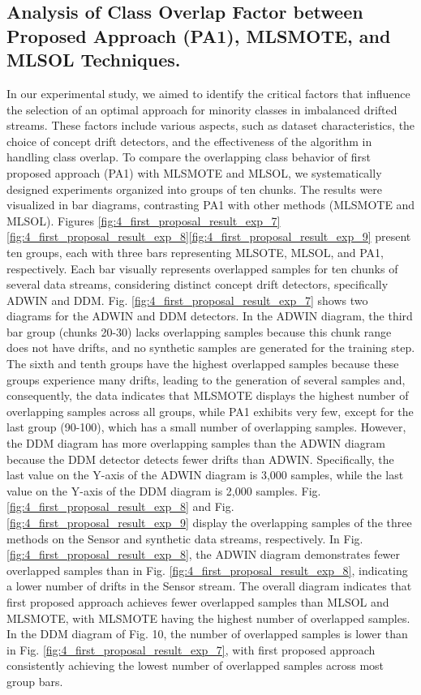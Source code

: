 \subsection{Analysis of Class Overlap Factor between Proposed Approach (PA1), MLSMOTE, and MLSOL Techniques.}
In our experimental study, we aimed to identify the critical factors that influence the selection of an optimal approach for minority classes in imbalanced drifted streams. These factors include various aspects, such as dataset characteristics, the choice of concept drift detectors, and the effectiveness of the algorithm in handling class overlap. To compare the overlapping class behavior of first proposed approach (PA1) with MLSMOTE and MLSOL, we systematically designed experiments organized into groups of ten chunks. The results were visualized in bar diagrams, contrasting PA1 with other methods (MLSMOTE and MLSOL). Figures \ref{fig:4_first_proposal_result_exp_7}\ref{fig:4_first_proposal_result_exp_8}\ref{fig:4_first_proposal_result_exp_9} present ten groups, each with three bars representing MLSOTE, MLSOL, and PA1, respectively. Each bar visually represents overlapped samples for ten chunks of several data streams, considering distinct concept drift detectors, specifically ADWIN and DDM.
Fig. \ref{fig:4_first_proposal_result_exp_7} shows two diagrams for the ADWIN and DDM detectors. In the ADWIN diagram, the third bar group (chunks 20-30) lacks overlapping samples because this chunk range does not have drifts, and no synthetic samples are generated for the training step. The sixth and tenth groups have the highest overlapped samples because these groups experience many drifts, leading to the generation of several samples and, consequently, the data indicates that MLSMOTE displays the highest number of overlapping samples across all groups, while PA1 exhibits very few, except for the last group (90-100), which has a small number of overlapping samples. However, the DDM diagram has more overlapping samples than the ADWIN diagram because the DDM detector detects fewer drifts than ADWIN. Specifically, the last value on the Y-axis of the ADWIN diagram is 3,000 samples, while the last value on the Y-axis of the DDM diagram is 2,000 samples. Fig. \ref{fig:4_first_proposal_result_exp_8} and Fig. \ref{fig:4_first_proposal_result_exp_9} display the overlapping samples of the three methods on the Sensor and synthetic data streams, respectively. In Fig. \ref{fig:4_first_proposal_result_exp_8}, the ADWIN diagram demonstrates fewer overlapped samples than in Fig. \ref{fig:4_first_proposal_result_exp_8}, indicating a lower number of drifts in the Sensor stream. The overall diagram indicates that first proposed approach achieves fewer overlapped samples than MLSOL and MLSMOTE, with MLSMOTE having the highest number of overlapped samples. In the DDM diagram of Fig. 10, the number of overlapped samples is lower than in Fig. \ref{fig:4_first_proposal_result_exp_7}, with first proposed approach consistently achieving the lowest number of overlapped samples across most group bars.
